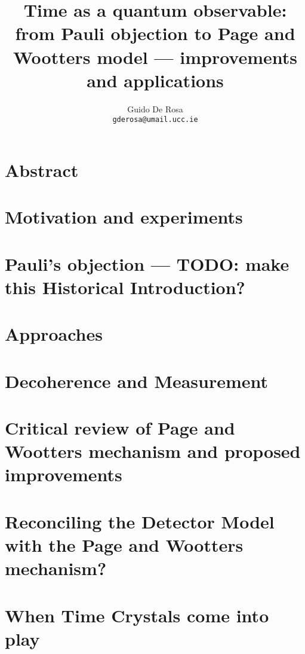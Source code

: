 \documentclass[oneside]{book}
\author{Guido De Rosa \\ \small\tt{gderosa@umail.ucc.ie}}
\title{Time as a quantum observable: from Pauli objection to Page and Wootters model --- improvements and applications}
\begin{document}
\maketitle

\tableofcontents

\chapter*{Abstract}


\chapter{Motivation and experiments}


\chapter{Pauli's objection --- TODO: make this Historical Introduction?}



\chapter{Approaches}


\chapter{Decoherence and Measurement}


\chapter{Critical review of Page and Wootters mechanism and proposed improvements}



\chapter{Reconciling the Detector Model with the Page and Wootters mechanism?}


\chapter{When Time Crystals come into play}

\end{document}
